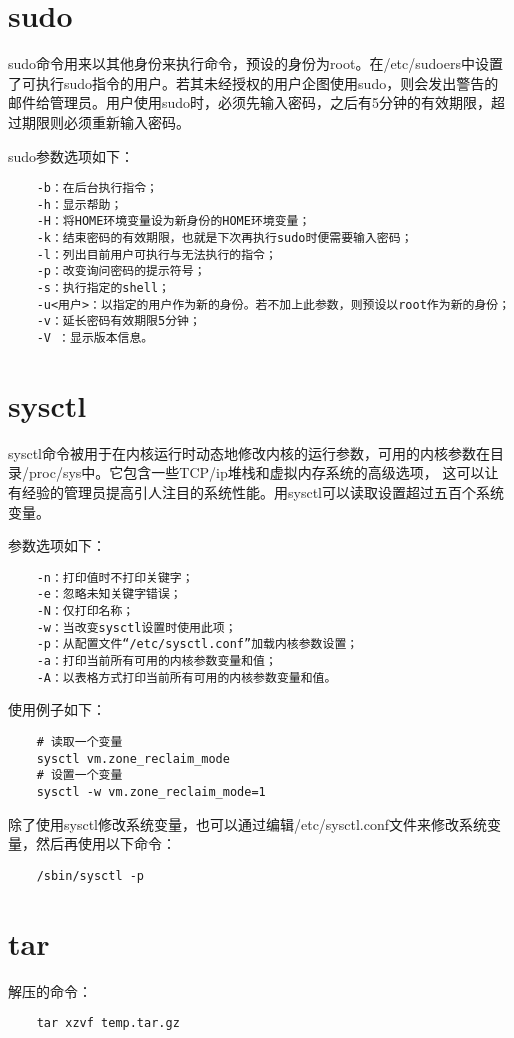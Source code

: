 \documentclass[a4paper,left=2.5cm,right=2.5cm,11pt]{article}
\begin{document}
\section{sudo}
	sudo命令用来以其他身份来执行命令，预设的身份为root。在/etc/sudoers中设置了可执行sudo指令的用户。若其未经授权的用户企图使用sudo，则会发出警告的邮件给管理员。用户使用sudo时，必须先输入密码，之后有5分钟的有效期限，超过期限则必须重新输入密码。\par

	sudo参数选项如下：
	\begin{lstlisting}
	-b：在后台执行指令； 
	-h：显示帮助； 
	-H：将HOME环境变量设为新身份的HOME环境变量； 
	-k：结束密码的有效期限，也就是下次再执行sudo时便需要输入密码；
	-l：列出目前用户可执行与无法执行的指令； 
	-p：改变询问密码的提示符号； 
	-s：执行指定的shell； 
	-u<用户>：以指定的用户作为新的身份。若不加上此参数，则预设以root作为新的身份； 
	-v：延长密码有效期限5分钟； 
	-V ：显示版本信息。
	\end{lstlisting}

\section{sysctl}
	sysctl命令被用于在内核运行时动态地修改内核的运行参数，可用的内核参数在目录/proc/sys中。它包含一些TCP/ip堆栈和虚拟内存系统的高级选项， 这可以让有经验的管理员提高引人注目的系统性能。用sysctl可以读取设置超过五百个系统变量。\par

	参数选项如下：
	\begin{lstlisting}
	-n：打印值时不打印关键字； 
	-e：忽略未知关键字错误； 
	-N：仅打印名称； 
	-w：当改变sysctl设置时使用此项； 
	-p：从配置文件“/etc/sysctl.conf”加载内核参数设置； 
	-a：打印当前所有可用的内核参数变量和值； 
	-A：以表格方式打印当前所有可用的内核参数变量和值。
	\end{lstlisting}

	使用例子如下：
	\begin{lstlisting}
	# 读取一个变量
	sysctl vm.zone_reclaim_mode
	# 设置一个变量
	sysctl -w vm.zone_reclaim_mode=1
	\end{lstlisting}

	除了使用sysctl修改系统变量，也可以通过编辑/etc/sysctl.conf文件来修改系统变量，然后再使用以下命令：
	\begin{lstlisting}
	/sbin/sysctl -p
	\end{lstlisting}

\section{tar}
	解压的命令：
	\begin{lstlisting}
	tar xzvf temp.tar.gz
	\end{lstlisting}
\end{document}
